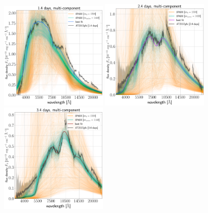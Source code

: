 \documentclass[twocolumn,twocolappendix]{aastex63}
\begin{document}
\begin{figure}[!ht]
\end{figure}

\begin{figure}[!ht]
    \centering
    \includegraphics[width=0.47\textwidth]{figs/appendix/all-spec/230726_113032_single_all_TARDIS_evals_mactive-1440_m0-1500.png}
    \includegraphics[width=0.47\textwidth]{figs/appendix/all-spec/230412_035244_single_all_TARDIS_evals_mactive-1020_m0-1500.png}
    \includegraphics[width=0.47\textwidth]{figs/appendix/all-spec/230626_073230_single_all_TARDIS_evals_mactive-1140_m0-1500.png}

\end{figure}
\end{document}
